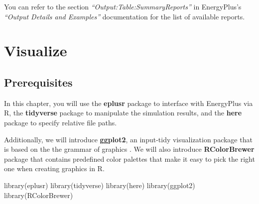 \documentclass[
]{book}
\newenvironment{Shaded}{\begin{snugshade}}{\end{snugshade}}
\newcommand{\AttributeTok}[1]{\textcolor[rgb]{0.77,0.63,0.00}{#1}}
\newcommand{\ConstantTok}[1]{\textcolor[rgb]{0.00,0.00,0.00}{#1}}
\newcommand{\DecValTok}[1]{\textcolor[rgb]{0.00,0.00,0.81}{#1}}
\newcommand{\DocumentationTok}[1]{\textcolor[rgb]{0.56,0.35,0.01}{\textbf{\textit{#1}}}}
\newcommand{\FunctionTok}[1]{\textcolor[rgb]{0.00,0.00,0.00}{#1}}
\newcommand{\NormalTok}[1]{#1}
\newcommand{\OtherTok}[1]{\textcolor[rgb]{0.56,0.35,0.01}{#1}}
\newcommand{\SpecialCharTok}[1]{\textcolor[rgb]{0.00,0.00,0.00}{#1}}
\newcommand{\StringTok}[1]{\textcolor[rgb]{0.31,0.60,0.02}{#1}}
\begin{document}
\begin{Shaded}
\end{Shaded}

You can refer to the section \emph{``Output:Table:SummaryReports''} in EnergyPlus's \emph{``Output Details and Examples''} documentation for the list of available reports.

\hypertarget{visualize}{%
\chapter{Visualize}\label{visualize}}

\hypertarget{prerequisites-9}{%
\section{Prerequisites}\label{prerequisites-9}}

In this chapter, you will use the \textbf{eplusr} package to interface with EnergyPlus via R, the \textbf{tidyverse} package to manipulate the simulation results, and the \textbf{here} package to specify relative file paths.

Additionally, we will introduce \textbf{ggplot2}, an input-tidy visualization package that is based on the the grammar of graphics \citep{wilkinson_grammar_2012}. We will also introduce \textbf{RColorBrewer} package that contains predefined color palettes that make it easy to pick the right one when creating graphics in R.

\begin{Shaded}
\begin{Highlighting}[]
\FunctionTok{library}\NormalTok{(eplusr)}
\FunctionTok{library}\NormalTok{(tidyverse)}
\FunctionTok{library}\NormalTok{(here)}
\FunctionTok{library}\NormalTok{(ggplot2)}
\FunctionTok{library}\NormalTok{(RColorBrewer)}
\end{Highlighting}
\end{Shaded}
\end{document}
